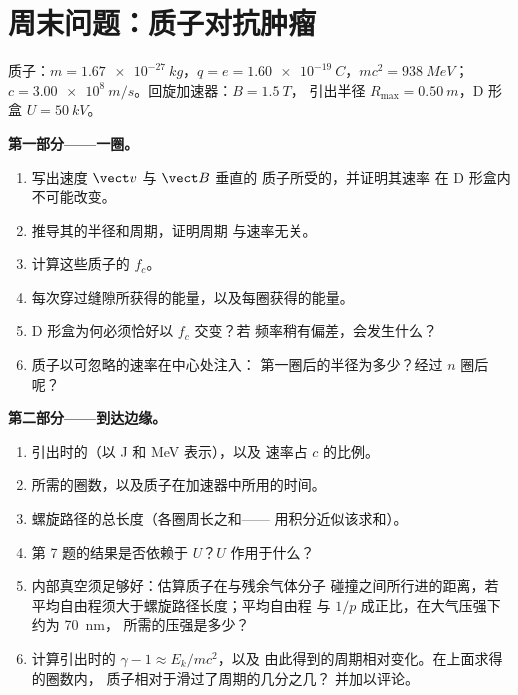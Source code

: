 \section{周末问题：质子对抗肿瘤}

\begin{problem}
\label{pb:b1:charged-particles:1}
质子：$m = \qty{1.67e-27}{kg}$，$q = e = \qty{1.60e-19}{C}$，$mc^2 =
\qty{938}{MeV}$；$c = \qty{3.00e8}{m/s}$。回旋加速器：$B = \qty{1.5}{T}$，
引出半径 $R_{\max} = \qty{0.50}{m}$，D 形盒
$U = \qty{50}{kV}$。

\medskip
\noindent\textbf{第一部分——一圈。}
\begin{enumerate}
  \item 写出速度 $\vect v$ 与 $\vect B$ 垂直的
        质子所受的，并证明其速率
        在 D 形盒内不可能改变。
  \item 推导其的半径和周期，证明周期
        与速率无关。
  \item 计算这些质子的 $f_c$。
  \item 每次穿过缝隙所获得的能量，以及每圈获得的能量。
  \item D 形盒为何必须恰好以 $f_c$ 交变？若
        频率稍有偏差，会发生什么？
  \item 质子以可忽略的速率在中心处注入：
        第一圈后的半径为多少？经过 $n$ 圈后呢？
\end{enumerate}

\medskip
\noindent\textbf{第二部分——到达边缘。}
\begin{enumerate}[resume]
  \item 引出时的（以 J 和 MeV 表示），以及
        速率占 $c$ 的比例。
  \item 所需的圈数，以及质子在加速器中所用的时间。
  \item 螺旋路径的总长度（各圈周长之和——
        用积分近似该求和）。
  \item 第 7 题的结果是否依赖于 $U$？$U$
        作用于什么？
  \item 内部真空须足够好：估算质子在与残余气体分子
        碰撞之间所行进的距离，若
        平均自由程须大于螺旋路径长度；平均自由程
        与 $1/p$ 成正比，在大气压强下约为 \qty{70}{nm}，
        所需的压强是多少？
  \item 计算引出时的 $\gamma - 1 \approx E_k/mc^2$，以及
        由此得到的周期相对变化。在上面求得的圈数内，
        质子相对于滑过了周期的几分之几？
        并加以评论。
\end{enumerate}


\end{problem}
